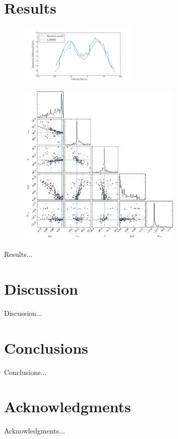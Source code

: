 \documentclass{emulateapj}
\begin{document}
\section{Results}
\label{sec:results}


\begin{figure}
\begin{center}
  \includegraphics[width=0.5\textwidth]{mcmc.png}
\end{center}
\caption{
    \label{fig:mcmc_result}}  
\end{figure}

\begin{figure}
\begin{center}
  \includegraphics[width=0.7\textwidth]{parameters.png}
\end{center}
\caption{
    \label{fig:mcmc_triangle}}  
\end{figure}

Results...\\


\section{Discussion}
\label{sec:discussion}

Discussion...\\


\section{Conclusions}
\label{sec:conclusions}

Conclusions...\\


\section*{Acknowledgments}

Acknowledgments...\\





\end{document}
